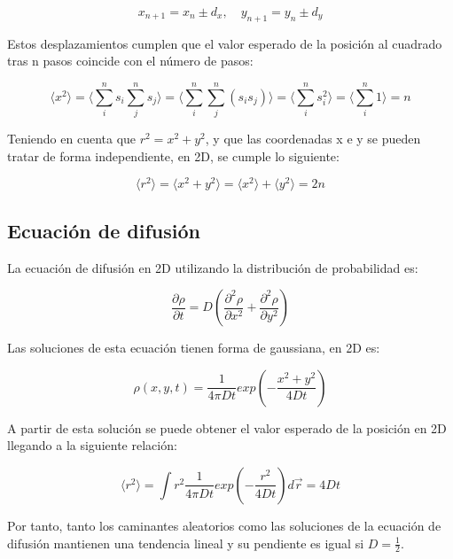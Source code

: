 \documentclass[11pt,a4paper]{article}
\begin{document}
\begin{equation}
x_{n+1} = x_n \pm d_x, \quad y_{n+1} = y_n \pm d_y
\end{equation}

Estos desplazamientos cumplen que el valor esperado de la posición al cuadrado tras n pasos coincide con el número de pasos:

\begin{equation}
\langle x^2 \rangle =\langle \sum^n_is_i\sum^n_js_j \rangle =\langle \sum^n_i\sum^n_j(s_is_j) \rangle =\langle \sum^n_is_i^2 \rangle =\langle \sum^n_i1 \rangle = n
\end{equation}

Teniendo en cuenta que $r^2=x^2+y^2$, y que las coordenadas x e y se pueden tratar de forma independiente, en 2D, se cumple lo siguiente:

\begin{equation}
\langle r^2 \rangle =\langle x^2+y^2 \rangle =\langle x^2 \rangle +\langle y^2 \rangle = 2n
\end{equation}
 
\subsection{Ecuación de difusión}

La ecuación de difusión en 2D utilizando la distribución de probabilidad es:

\begin{equation}
\frac{\partial \rho}{\partial t} = D \left( \frac{\partial^2 \rho}{\partial x^2} + \frac{\partial^2 \rho}{\partial y^2} \right)
\end{equation}

Las soluciones de esta ecuación tienen forma de gaussiana, en 2D es:

\begin{equation}
\rho(x,y,t)=\frac{1}{4\pi Dt}exp(-\frac{x^2+y^2}{4Dt})
\end{equation}

A partir de esta solución se puede obtener el valor esperado de la posición en 2D llegando a la siguiente relación:

\begin{equation}
\langle r^2 \rangle = \int r^2 \frac{1}{4\pi Dt}exp(-\frac{r^2}{4Dt})d\vec{r}=4Dt
\end{equation}

Por tanto, tanto los caminantes aleatorios como las soluciones de la ecuación de difusión mantienen una tendencia lineal y su pendiente es igual si $D=\frac{1}{2}$.
\end{document}
